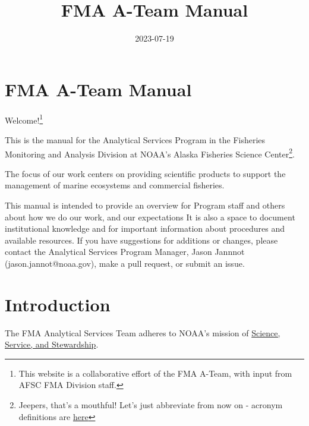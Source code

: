 \documentclass[
  letterpaper,
  DIV=11,
  numbers=noendperiod]{scrreprt}
\title{FMA A-Team Manual}
\author{}
\date{2023-07-19}
\renewcommand*\contentsname{Table of contents}
\newcommand\contentsname{Table of contents}
\begin{document}
\maketitle
\ifdefined\Shaded\renewenvironment{Shaded}{\begin{tcolorbox}[interior hidden, borderline west={3pt}{0pt}{shadecolor}, breakable, enhanced, boxrule=0pt, frame hidden, sharp corners]}{\end{tcolorbox}}\fi

\renewcommand*\contentsname{Table of contents}
{
\hypersetup{linkcolor=}
\setcounter{tocdepth}{2}
\tableofcontents
}

\hypertarget{fma-a-team-manual}{%
\chapter{FMA A-Team Manual}\label{fma-a-team-manual}}

Welcome!\footnote{This website is a collaborative effort of the FMA
  A-Team, with input from AFSC FMA Division staff.}

This is the manual for the Analytical Services Program in the Fisheries
Monitoring and Analysis Division at NOAA's Alaska Fisheries Science
Center\footnote{Jeepers, that's a mouthful! Let's just abbreviate from
  now on - acronym definitions are
  \protect\hyperlink{sec-acronyms}{here}}.

The focus of our work centers on providing scientific products to
support the management of marine ecosystems and commercial fisheries.

This manual is intended to provide an overview for Program staff and
others about how we do our work, and our expectations It is also a space
to document institutional knowledge and for important information about
procedures and available resources. If you have suggestions for
additions or changes, please contact the Analytical Services Program
Manager, Jason Jannnot (jason.jannot@noaa.gov), make a pull request, or
submit an issue.


\hypertarget{intro}{%
\chapter{Introduction}\label{intro}}

The FMA Analytical Services Team adheres to NOAA's mission of
\href{https://www.noaa.gov/our-mission-and-vision}{Science, Service, and
Stewardship}.
\end{document}
